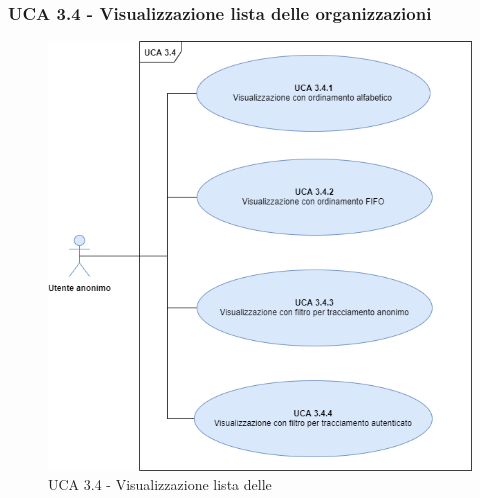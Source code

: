 \subsubsection{UCA 3.4 - Visualizzazione lista delle organizzazioni}%

\begin{figure}[h]
	\centering	
	\includegraphics[scale=0.45, center]{Sezioni/UseCase/Immagini/UCA3.4.png}
	\caption{UCA 3.4 - Visualizzazione lista delle }
\end{figure}

